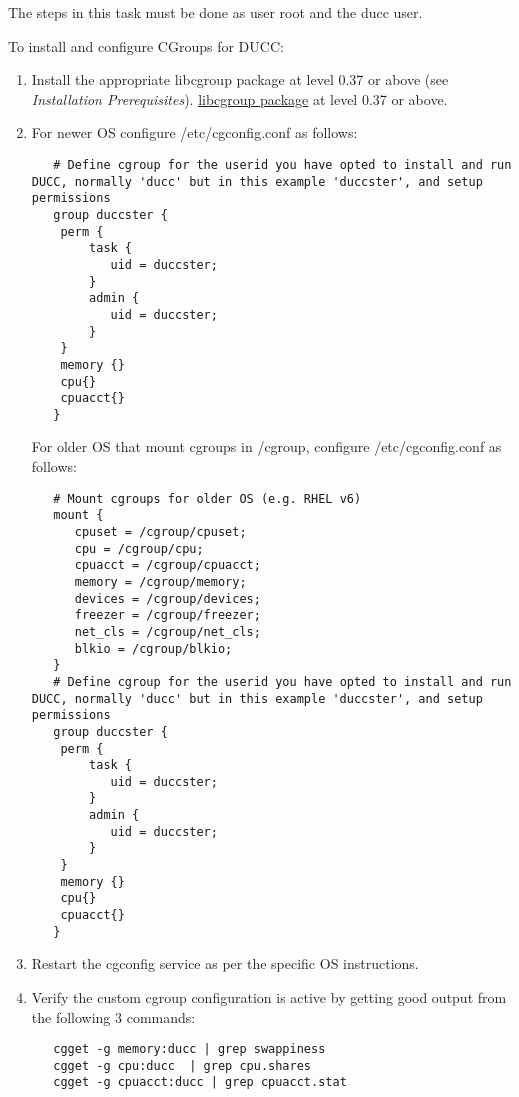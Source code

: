     The steps in this task must be done as user root and the ducc user.

    To install and configure CGroups for DUCC:
    \begin{enumerate}
       \item Install the appropriate 
   \ifdefined\DUCCSTANDALONE
   libcgroup package at level 0.37 or above (see {\em Installation Prerequisites}).
   \else
   \hyperref[sec:install.prerequisites]{libcgroup package} at level 0.37 or above.
   \fi

       \item For newer OS configure /etc/cgconfig.conf as follows:
\begin{verbatim}
   # Define cgroup for the userid you have opted to install and run DUCC, normally 'ducc' but in this example 'duccster', and setup permissions
   group duccster {
    perm {
        task {
           uid = duccster;
        }
        admin {
           uid = duccster;
        }
    }
    memory {}
    cpu{}
    cpuacct{}
   }
\end{verbatim}
For older OS that mount cgroups in /cgroup, configure /etc/cgconfig.conf as follows:
\begin{verbatim}
   # Mount cgroups for older OS (e.g. RHEL v6)
   mount {
      cpuset = /cgroup/cpuset;
      cpu = /cgroup/cpu;
      cpuacct = /cgroup/cpuacct;
      memory = /cgroup/memory;
      devices = /cgroup/devices;
      freezer = /cgroup/freezer;
      net_cls = /cgroup/net_cls;
      blkio = /cgroup/blkio;
   }
   # Define cgroup for the userid you have opted to install and run DUCC, normally 'ducc' but in this example 'duccster', and setup permissions
   group duccster {
    perm {
        task {
           uid = duccster;
        }
        admin {
           uid = duccster;
        }
    }
    memory {}
    cpu{}
    cpuacct{}
   }
\end{verbatim}

       \item Restart the cgconfig service as per the specific OS instructions.
         
       \item Verify the custom cgroup configuration is active by getting good output from the following 3 commands: 
\begin{verbatim}
   cgget -g memory:ducc | grep swappiness
   cgget -g cpu:ducc  | grep cpu.shares
   cgget -g cpuacct:ducc | grep cpuacct.stat
\end{verbatim}

    \end{enumerate}

